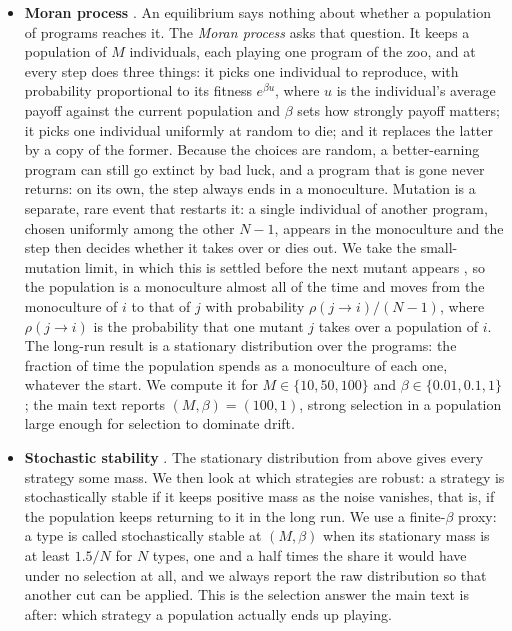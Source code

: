 \documentclass[twoside,11pt]{article}
\begin{document}
\begin{itemize}
    \item \textbf{Moran process} \citep{Moran_1958,Nowak}. An equilibrium says nothing about whether a population of programs reaches it. The \emph{Moran process} asks that question. It keeps a population of $M$ individuals, each playing one program of the zoo, and at every step does three things: it picks one individual to reproduce, with probability proportional to its fitness $e^{\beta u}$, where $u$ is the individual's average payoff against the current population and $\beta$ sets how strongly payoff matters; it picks one individual uniformly at random to die; and it replaces the latter by a copy of the former. Because the choices are random, a better-earning program can still go extinct by bad luck, and a program that is gone never returns: on its own, the step always ends in a monoculture. Mutation is a separate, rare event that restarts it: a single individual of another program, chosen uniformly among the other $N-1$, appears in the monoculture and the step then decides whether it takes over or dies out. We take the small-mutation limit, in which this is settled before the next mutant appears \citep{Nowak}, so the population is a monoculture almost all of the time and moves from the monoculture of $i$ to that of $j$ with probability $\rho(j \to i)/(N-1)$, where $\rho(j \to i)$ is the probability that one mutant $j$ takes over a population of $i$. The long-run result is a stationary distribution over the programs: the fraction of time the population spends as a monoculture of each one, whatever the start. We compute it for $M \in \{10, 50, 100\}$ and $\beta \in \{0.01, 0.1, 1\}$; the main text reports $(M,\beta) = (100,1)$, strong selection in a population large enough for selection to dominate drift.

    \item \textbf{Stochastic stability} \citep{stochasticEGD,evolutionOfConventions}. The stationary distribution from above gives every strategy some mass. We then look at which strategies are robust: a strategy is stochastically stable if it keeps positive mass as the noise vanishes, that is, if the population keeps returning to it in the long run. We use a finite-$\beta$ proxy: a type is called stochastically stable at $(M,\beta)$ when its stationary mass is at least $1.5/N$ for $N$ types, one and a half times the share it would have under no selection at all, and we always report the raw distribution so that another cut can be applied. This is the selection answer the main text is after: which strategy a population actually ends up playing.
\end{itemize}
\end{document}
